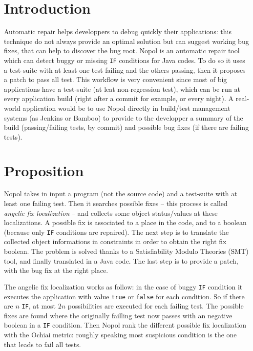 \section{Introduction}

Automatic repair helps developpers to debug quickly their applications: this technique do not always provide an optimal solution but can suggest working bug fixes, that can help to discover the bug root. \textsf{Nopol} is an automatic repair tool which can detect buggy or missing \verb!IF! conditions for \textsf{Java} codes. To do so it uses a test-suite with at least one test failing and the others passing, then it proposes a patch to pass all test. This workflow is very convenient since most of big applications have a test-suite (at leat non-regression test), which can be run at every application build (right after a commit for example, or every night). A real-world application would be to use \textsf{Nopol} directly in build/test management systems (as \textsf{Jenkins} or \textsf{Bamboo}) to provide to the developper a summary of the build (passing/failing tests, by commit) and possible bug fixes (if there are failing tests).

\section{Proposition}

\textsf{Nopol} takes in input a program (not the source code) and a test-suite with at least one failing test. Then it searches possible fixes -- this process is called \emph{angelic fix localization} -- and collects some object status/values at these localizations. A possible fix is associated to a place in the code, and to a boolean (because only \verb!IF! conditions are repaired). The next step is to translate the collected object informations in constraints in order to obtain the right fix boolean. The problem is solved thanks to a Satisfiability Modulo Theories (SMT) tool, and finally translated in a \textsf{Java} code. The last step is to provide a patch, with the bug fix at the right place.

The angelic fix localization works as follow: in the case of buggy \verb!IF! condition it executes the application with value \verb!true! or \verb!false! for each condition. So if there are $n$ \verb!IF!, at most $2n$ possibilities are executed for each failing test. The possible fixes are found where the originally failling test now passes with an negative boolean in a \verb!IF! condition. Then \textsf{Nopol} rank the different possible fix localization with the Ochiai metric: roughly speaking most suspicious condition is the one that leads to fail all tests.

